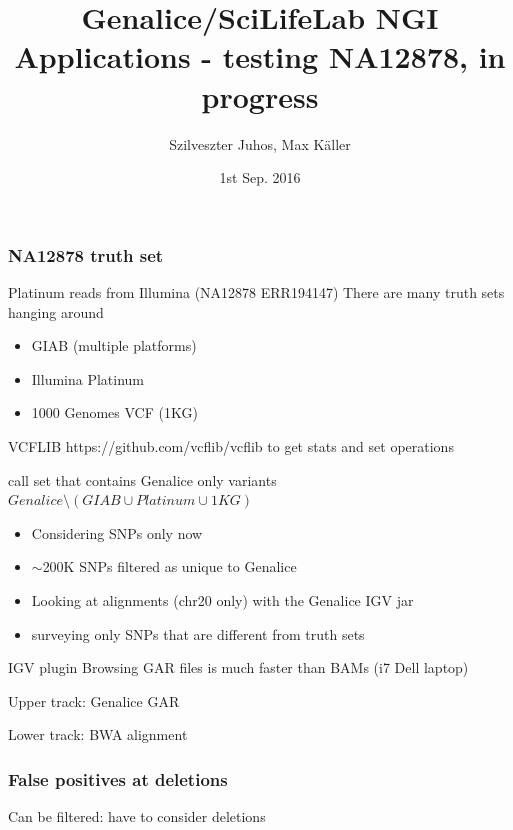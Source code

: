 \documentclass{beamer}
\title{Genalice/SciLifeLab NGI Applications - testing NA12878, in progress }
\author{Szilveszter Juhos, Max Käller}
\institute{SciLifeLab}
\date{1st Sep. 2016 }
\begin{document}
\frame{\titlepage}
			  
\begin{frame}
	\frametitle{NA12878 truth set}
	\begin{block}{Platinum reads from Illumina (NA12878 ERR194147) }
	There are many truth sets hanging around
	\end{block} 
	\begin{itemize}
		\item GIAB (multiple platforms)
		\item Illumina Platinum 
		\item 1000 Genomes VCF (1KG)
	\end{itemize}
VCFLIB https://github.com/vcflib/vcflib to get stats and set operations

	\begin{block}{call set that contains Genalice only variants}
	$ Genalice \setminus (GIAB \cup Platinum \cup 1KG) $
	\end{block}
\end{frame}

\begin{frame}
	\begin{itemize}
		\item Considering SNPs only now
		\item $\sim$200K SNPs filtered as unique to Genalice
		\item Looking at alignments (chr20 only) with the Genalice IGV jar
		\item surveying only SNPs that are different from truth sets
	\end{itemize}
	\begin{block}{IGV plugin}
	Browsing GAR files is much faster than BAMs (i7 Dell laptop)

	Upper track: Genalice GAR

	Lower track: BWA alignment
	\end{block}
\end{frame}

\begin{frame}
\frametitle{False positives at deletions}
Can be filtered: have to consider deletions
\end{frame}
\end{document}
